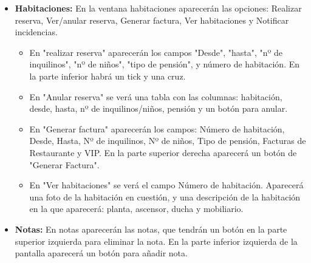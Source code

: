 \documentclass[spanish,a4paper,12pt]{report}	%
\begin{document}
\begin{itemize}
\begin{itemize}
					 \item \textbf{Habitaciones: }En la ventana habitaciones aparecerán las opciones: Realizar reserva, Ver/anular reserva, Generar factura, Ver habitaciones y Notificar incidencias. 
					\begin{itemize}		
							\item En "realizar reserva" aparecerán los campos "Desde", "hasta", "nº de inquilinos", "nº de niños", "tipo de pensión", y número de habitación. En la parte inferior habrá un tick y una cruz.
							\item En "Anular reserva" se verá una tabla con las columnas: habitación, desde, hasta, nº de inquilinos/niños, pensión y un botón para anular.\\
							\item En "Generar factura" aparecerán los campos: Número de habitación, Desde, Hasta, Nº de inquilinos, Nº de niños, Tipo de pensión, Facturas de Restaurante y VIP. En la parte superior derecha aparecerá un botón de "Generar Factura". \\
							\item En "Ver habitaciones" se verá el campo Número de habitación. Aparecerá una foto de la habitación en cuestión, y una descripción de la habitación en la que aparecerá: planta, ascensor, ducha y mobiliario. 
					\end{itemize}
					 \item \textbf{Notas: }En notas aparecerán las notas, que tendrán un botón en la parte superior izquierda para eliminar la nota. En la parte inferior izquierda de la pantalla aparecerá un botón para añadir nota. 
				\end{itemize}
				

\end{itemize}
\end{document}
